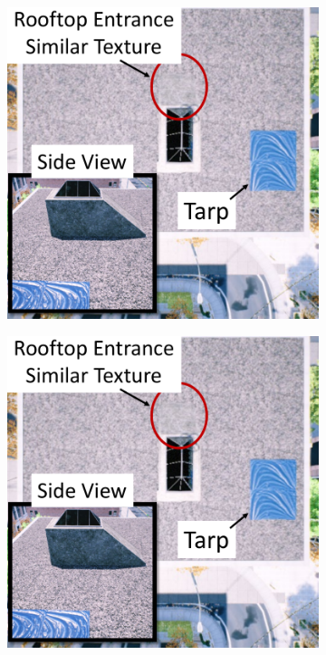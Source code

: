 \begin{figure}[ht]
  \begin{subfigure}{.25\columnwidth}
    \centering\includegraphics[page=5, width=.99\columnwidth]{chapter_6_landingsim/figs/CompareAlgs_Case1.pdf}
    \caption{\label{fig:ch6_case1_d}}
  \end{subfigure}
  \begin{subfigure}{.25\columnwidth}
    \centering\includegraphics[page=4, width=.99\columnwidth]{chapter_6_landingsim/figs/CompareAlgs_Case1.pdf}

\end{subfigure}
\end{figure}

